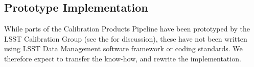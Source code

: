 



\subsection{Prototype Implementation}
\label{sec:CPP:prototypeImplementation}
While parts of the Calibration Products Pipeline have been prototyped by the LSST Calibration Group (see the \NewPCP for discussion), these have not been written using LSST Data Management software framework or coding standards. We therefore expect to transfer the know-how, and rewrite the implementation.












